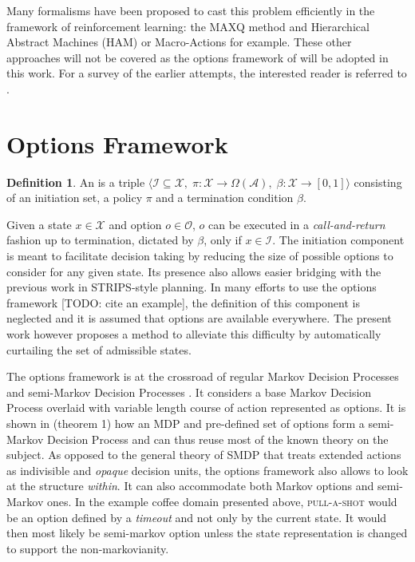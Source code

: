 \documentclass[12pt, oneside, extrafontsizes]{memoir}  %
\newcommand{\mdp}{Markov Decision Process\xspace}
\newcommand{\mdps}{Markov Decision Processes\xspace}
\newcommand{\todo}[1]{[TODO: #1]}
\newcommand{\termidx}[1]{\index{#1}{\textbf{#1}}}
\theoremstyle{plain}
\theoremstyle{definition}
\newtheorem{defn}{Definition}[section]
\begin{document}
Many formalisms have been proposed to cast this problem efficiently in the framework
of reinforcement learning: the MAXQ method \cite{Dietterich1998} and Hierarchical
Abstract Machines (HAM) \cite{Parr1997} or Macro-Actions \cite{Hauskrecht1998} for
example. These other approaches will not be covered as the options framework of 
\cite{Sutton1999} will be adopted in this work. For a survey of the earlier attempts, the
interested reader is referred to \cite{StolleThesis2004, Sutton1999}.

\section{Options Framework}
\begin{defn}
An \termidx{Option} is a triple $\langle \mathcal{I} \subseteq \mathcal{X},\;
\mathcal{\pi} : \mathcal{X} \to \Omega(\mathcal{A}),\; \beta : \mathcal{X} \to [0, 1]
\rangle$ consisting of an initiation set, a policy $\pi$ and a termination condition
$\beta$.
\end{defn}

Given a state $x \in \mathcal{X}$ and option $o \in \mathcal{O}$, $o$ can be
executed in a \textit{call-and-return} fashion up to termination, dictated by $\beta$,
only if $x \in \mathcal{I}$. The initiation component is meant to facilitate decision
taking by reducing the size of possible options to consider for any given state. Its
presence also allows easier bridging with the previous work in STRIPS-style
\cite{Fikes1972} planning. In many efforts to use the options framework \todo{cite an
example}, the definition of this component is neglected and it is assumed that options
are available everywhere. The present work however proposes a method to alleviate
this difficulty by automatically curtailing the set of admissible states.

The options framework is at the crossroad of regular \mdps and semi-\mdps
\cite{Bradtke1994}. It considers a base \mdp overlaid with variable length course of
action represented as options. It is shown in \cite{Sutton1999} (theorem 1) how an
MDP and pre-defined set of options form a semi-\mdp and can thus reuse most of the
known theory on the subject. As opposed to the general theory of SMDP that treats
extended actions as indivisible and \textit{opaque} decision units, the options
framework also allows to look at the structure \textit{within}. It can also accommodate
both Markov options and semi-Markov ones. In the example coffee domain presented
above, \textsc{pull-a-shot} would be an option defined by a \textit{timeout} and not
only by the current state. It would then most likely be semi-markov option unless the
state representation is changed to support the non-markovianity.
\end{document}
